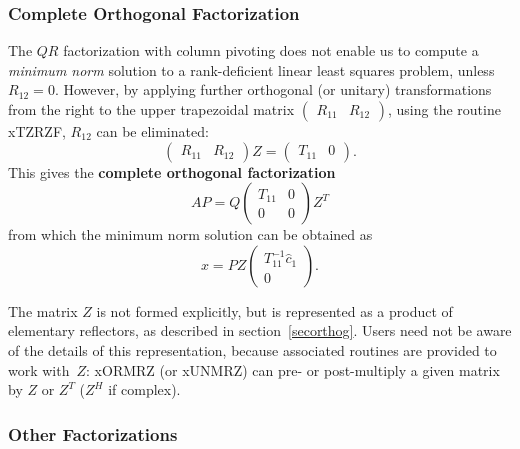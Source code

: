 \subsubsection{Complete Orthogonal Factorization}

The $QR$ factorization with column pivoting does not enable us to compute
a {\it minimum norm} solution to a rank-deficient linear least squares problem,
unless $R_{12} = 0$. However,
by applying further orthogonal (or unitary) transformations
from the right to the upper trapezoidal matrix
$\left( \begin{array}{cc}R_{11} & R_{12}\end{array} \right)$,
using the routine xTZRZF, $R_{12}$ can be eliminated:
\[
\left( \begin{array}{cc}R_{11} & R_{12}\end{array}\right) Z =
\left( \begin{array}{cc}T_{11} & 0\end{array}\right) .
\]
This gives the {\bf complete orthogonal factorization}
\[
A P = Q \left(
\begin{array}{cc}T_{11} & 0 \\ 0 & 0\end{array}
\right) Z^{T}
\]
from which the minimum norm solution can be obtained as
\[
x = P Z \left( \begin{array}{c} T_{11}^{-1} \hat{c}_1 \\ 0\end{array}\right) .
\]

The matrix $Z$ is not formed explicitly, but is represented as a product of elementary
reflectors,
 as described in section~\ref{secorthog}.
Users need not be aware of the details of this representation,
because associated routines are provided to work with~$Z$:
xORMRZ (or xUNMRZ) can pre- or post-multiply
a given matrix by $Z$ or $Z^T$ ($Z^H$ if complex).

\subsubsection{Other Factorizations}

